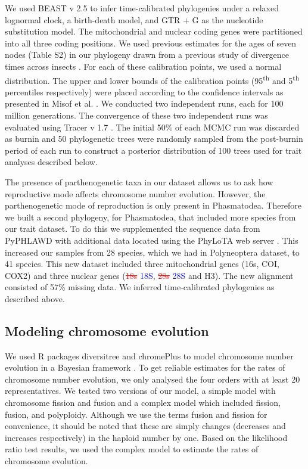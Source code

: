 \documentclass[]{rsos}%
\begin{document}
We used BEAST v 2.5 \cite{bouckaert2014beast} to infer time-calibrated phylogenies under a relaxed lognormal clock, a birth-death model, and GTR + G as the nucleotide substitution model.
The mitochondrial and nuclear coding genes were partitioned into all three coding positions. 
We used previous estimates for the ages of seven nodes (Table S2) in our phylogeny drawn from a previous study of divergence times across insects \cite{misof2014phylogenomics}.
For each of these calibration points, we used a normal distribution.
The upper and lower bounds of the calibration points (95\textsuperscript{th} and 5\textsuperscript{th} percentiles respectively) were placed according to the confidence intervals as presented in Misof et al. \cite{misof2014phylogenomics}. 
We conducted two independent runs, each for 100 million generations.
The convergence of these two independent runs was evaluated using Tracer v 1.7 \cite{rambaut2018tracer}.
The initial 50\% of each MCMC run was discarded as burnin and 50 phylogenetic trees were randomly sampled from the post-burnin period of each run to construct a posterior distribution of 100 trees used for trait analyses described below.

The presence of parthenogenetic taxa in our dataset allows us to ask how reproductive mode affects chromosome number evolution.
However, the parthenogenetic mode of reproduction is only present in Phasmatodea.
Therefore we built a second phylogeny, for Phasmatodea, that included more species from our trait dataset.
To do this we supplemented the sequence data from PyPHLAWD with additional data located using the PhyLoTA web server \cite{sanderson2008}.
This increased our samples from 28 species, which we had in Polyneoptera dataset, to 41 species. 
This new dataset included three mitochondrial genes (16s, COI, COX2) and three nuclear genes (\textcolor{red}{\st{18s}} \textcolor{blue}{18S}, \textcolor{red}{\st{28s}} \textcolor{blue}{28S} and H3).
The new alignment consisted of 57\% missing data.
We inferred time-calibrated phylogenies as described above.


\subsection{Modeling chromosome evolution}
We used R packages diversitree and chromePlus to model chromosome number evolution in a Bayesian framework \cite{fitzjohn2012, blackmon2019meiotic}.
To get reliable estimates for the rates of chromosome number evolution, we only analysed the four orders with at least 20 representatives.
We tested two versions of our model, a simple model with chromosome fission and fusion and a complex model which included fission, fusion, and polyploidy.
Although we use the terms fusion and fission for convenience, it should be noted that these are simply changes (decreases and increases respectively) in the haploid number by one.
Based on the likelihood ratio test results, we used the complex model to estimate the rates of chromosome evolution.
\end{document}
